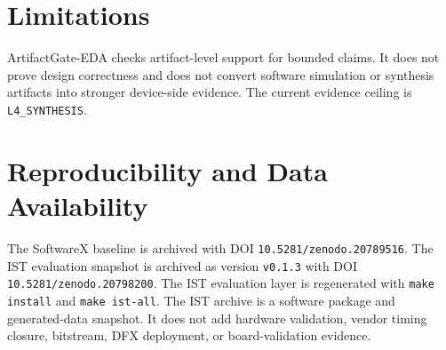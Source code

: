 \documentclass[preprint,12pt]{elsarticle}
\begin{document}
\section{Limitations}

ArtifactGate-EDA checks artifact-level support for bounded claims. It does not
prove design correctness and does not convert software simulation or synthesis
artifacts into stronger device-side evidence. The current evidence ceiling is
\texttt{L4\_SYNTHESIS}.

\section{Reproducibility and Data Availability}

The SoftwareX baseline is archived with DOI \texttt{10.5281/zenodo.20789516}.
The IST evaluation snapshot is archived as version \texttt{v0.1.3} with DOI
\texttt{10.5281/zenodo.20798200}. The IST evaluation layer is regenerated with
\texttt{make install} and \texttt{make ist-all}. The IST archive is a software
package and generated-data snapshot. It does not add hardware validation,
vendor timing closure, bitstream, DFX deployment, or board-validation evidence.
\end{document}
